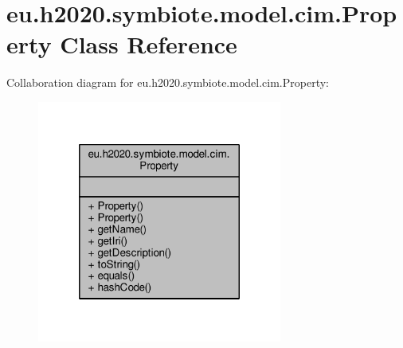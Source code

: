 \hypertarget{classeu_1_1h2020_1_1symbiote_1_1model_1_1cim_1_1Property}{}\section{eu.\+h2020.\+symbiote.\+model.\+cim.\+Property Class Reference}
\label{classeu_1_1h2020_1_1symbiote_1_1model_1_1cim_1_1Property}


Collaboration diagram for eu.\+h2020.\+symbiote.\+model.\+cim.\+Property\+:\nopagebreak
\begin{figure}[H]
\begin{center}
\leavevmode
\includegraphics[width=228pt]{classeu_1_1h2020_1_1symbiote_1_1model_1_1cim_1_1Property__coll__graph}
\end{center}
\end{figure}
